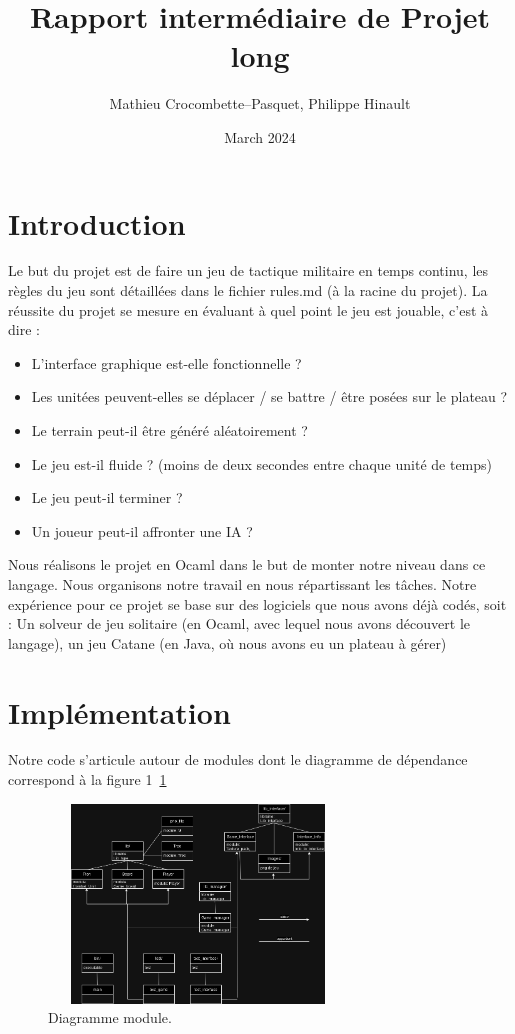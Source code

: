 \documentclass{article}
\title{Rapport intermédiaire de Projet long}
\author{Mathieu Crocombette--Pasquet, Philippe Hinault}
\date{March 2024}
\begin{document}
\maketitle


\section{Introduction}

Le but du projet est de faire un jeu de tactique militaire en temps continu, les règles du jeu sont détaillées dans le fichier rules.md (à la racine du projet).
La réussite du projet se mesure en évaluant à quel point le jeu est jouable, c'est à dire :

\begin{itemize}
\item L'interface graphique est-elle fonctionnelle ?
\item Les unitées peuvent-elles se déplacer / se battre / être posées sur le plateau ?
\item Le terrain peut-il être généré aléatoirement ?
\item Le jeu est-il fluide ? (moins de deux secondes entre chaque unité de temps)
\item Le jeu peut-il terminer ?
\item Un joueur peut-il affronter une IA ?
\end{itemize}

Nous réalisons le projet en Ocaml dans le but de monter notre niveau dans ce langage. Nous organisons notre travail en nous répartissant les tâches. Notre expérience pour ce projet se base sur des logiciels que nous avons déjà codés, soit : Un solveur de jeu solitaire (en Ocaml, avec lequel nous avons découvert le langage), un jeu Catane (en Java, où nous avons eu un plateau à gérer)

\section{Implémentation}

Notre code s'articule autour de modules dont le diagramme de dépendance correspond à la figure 1~\ref{fig:diagramme}

\begin{figure}
\label{fig:diagramme}
\hrulefill
\begin{center}
\includegraphics[height=200px,width=300px]{diagramme}
\end{center}
\caption{Diagramme module.}
\hrulefill
\end{figure}
\end{document}
